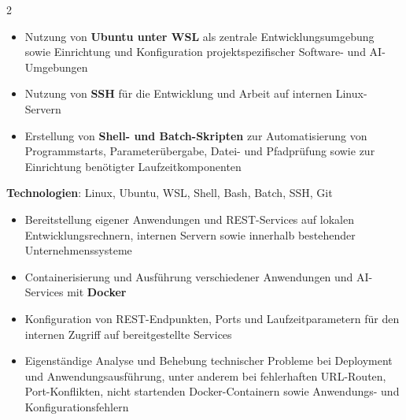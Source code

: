 \documentclass[10pt,a4paper,withhyper]{../altacv}
\begin{document}
\begin{paracol}{2}

  \vspace{1em}


  \vspace{1.0em}

  \begin{itemize}
    \item Nutzung von \textbf{Ubuntu unter WSL} als zentrale Entwicklungsumgebung sowie Einrichtung und Konfiguration projektspezifischer Software- und AI-Umgebungen
    \item Nutzung von \textbf{SSH} für die Entwicklung und Arbeit auf internen Linux-Servern
    \item Erstellung von \textbf{Shell- und Batch-Skripten} zur Automatisierung von Programmstarts, Parameterübergabe, Datei- und Pfadprüfung sowie zur Einrichtung benötigter Laufzeitkomponenten
  \end{itemize}

  \vspace{1.0em}

  \textbf{Technologien}: Linux, Ubuntu, WSL, Shell, Bash, Batch, SSH, Git
  \vspace{1.5em}


  \vspace{1.0em}

  \begin{itemize}
    \item Bereitstellung eigener Anwendungen und REST-Services auf lokalen Entwicklungsrechnern, internen Servern sowie innerhalb bestehender Unternehmenssysteme
    \item Containerisierung und Ausführung verschiedener Anwendungen und AI-Services mit \textbf{Docker}
    \item Konfiguration von REST-Endpunkten, Ports und Laufzeitparametern für den internen Zugriff auf bereitgestellte Services
    \item Eigenständige Analyse und Behebung technischer Probleme bei Deployment und Anwendungsausführung, unter anderem bei fehlerhaften URL-Routen, Port-Konflikten, nicht startenden Docker-Containern sowie Anwendungs- und Konfigurationsfehlern
  \end{itemize}


\end{paracol}
\end{document}
